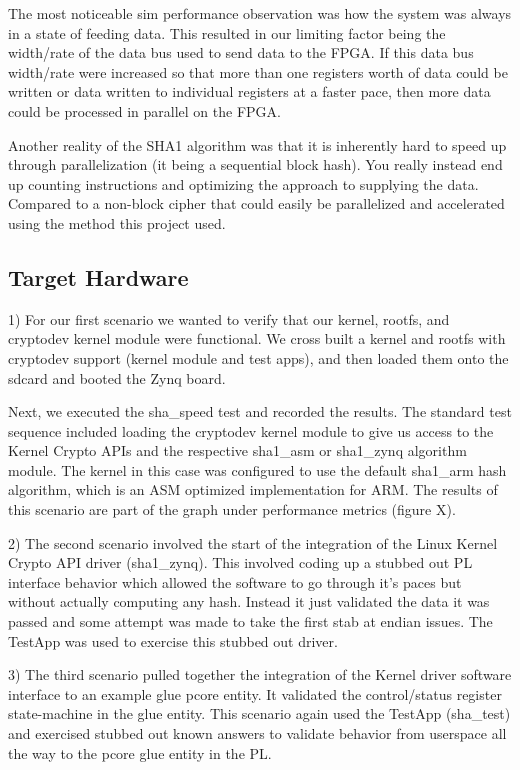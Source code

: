 \documentclass[journal]{IEEEtran}
\begin{document}
The most noticeable sim performance observation was how the system was always in a state of feeding data.  This resulted in our limiting factor being the width/rate of the data bus used to send data to the FPGA.  If this data bus width/rate were increased so that more than one registers worth of data could be written or data written to individual registers at a faster pace, then more data could be processed in parallel on the FPGA.  

Another reality of the SHA1 algorithm was that it is inherently hard to speed up through parallelization (it being a sequential block hash).  You really instead end up counting instructions and optimizing the approach to supplying the data.  Compared to a non-block cipher that could easily be parallelized and accelerated using the method this project used. 
\subsection{Target Hardware}
1) For our first scenario we wanted to verify that our kernel, rootfs, and cryptodev kernel module were functional.  We cross built a kernel and rootfs with cryptodev support (kernel module and test apps), and then loaded them onto the sdcard and booted the Zynq board.  

Next, we executed the sha\_speed test and recorded the results.  The standard test sequence included loading the cryptodev kernel module to give us access to the Kernel Crypto APIs and the respective sha1\_asm or sha1\_zynq algorithm module.  
The kernel in this case was configured to use the default sha1\_arm hash algorithm, which is an ASM optimized implementation for ARM.  The results of this scenario are part of the graph under performance metrics (figure X).

2) The second scenario involved the start of the integration of the Linux Kernel Crypto API driver (sha1\_zynq).  This involved coding up a stubbed out PL interface behavior which allowed the software to go through it’s paces but without actually computing any hash.  Instead it just validated the data it was passed and some attempt was made to take the first stab at endian issues.  The TestApp was used to exercise this stubbed out driver.

3) The third scenario pulled together the integration of the Kernel driver software interface to an example glue pcore entity.  It validated the control/status register state-machine in the glue entity.  This scenario again used the TestApp (sha\_test) and exercised stubbed out known answers to validate behavior from userspace all the way to the pcore glue entity in the PL.
\end{document}
